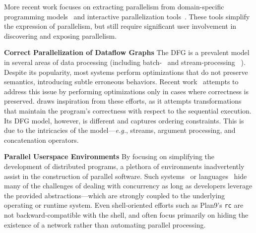 \documentclass[letterpaper,twocolumn,10pt]{article}
\newcommand{\eg}{{\em e.g.}, }
\newcommand{\heading}[1]{\vspace{4pt}\noindent\textbf{#1}\enspace}
\newcommand{\ttt}[1]{\texttt{#1}}
\begin{document}
More recent work focuses on extracting parallelism from domain-specific programming models~\cite{cilk5, streamIt, galois} and interactive parallelization tools~\cite{parascope, ipat}.
These tools simplify the expression of parallelism, but still require significant user involvement in discovering and exposing parallelism.

\heading{Correct Parallelization of Dataflow Graphs}
The DFG is a prevalent model in several areas of data processing (including batch-~\cite{mapreduce:08, spark:12} and stream-processing ~\cite{murray2013naiad, carbone2015flink}).
Despite its popularity, most systems perform optimizations that do not preserve semantics, introducing subtle erroneous behaviors.
Recent work~\cite{HSSGG2014, SHGW2015, MSAIT2019} attempts to address this issue by performing optimizations only in cases where correctness is preserved.
\sys draws inspiration from these efforts, as it attempts transformations that maintain the program's correctness with respect to the sequential execution.
Its  DFG model, however, is different and captures ordering constraints.
This is due to the intricacies of the \unix model---\eg streams, argument processing, and concatenation operators.

\heading{Parallel Userspace Environments}
By focusing on simplifying the development of distributed programs, a plethora of environments inadvertently assist in the construction of parallel software.
Such systems~\cite{ousterhout1988sprite, mullender1990amoeba, pike1990plan9, barak1998mosix} or languages~\cite{erlang:96, acute:05, mace:07, cloudhaskell:11} hide many of the challenges of dealing with concurrency as long as developers leverage the provided abstractions---which are strongly coupled to the underlying operating or runtime system.
Even shell-oriented efforts such as Plan9's \ttt{rc} are not backward-compatible with the \unix shell, and often focus primarily on hiding the existence of a network rather than automating parallel processing.
\end{document}
